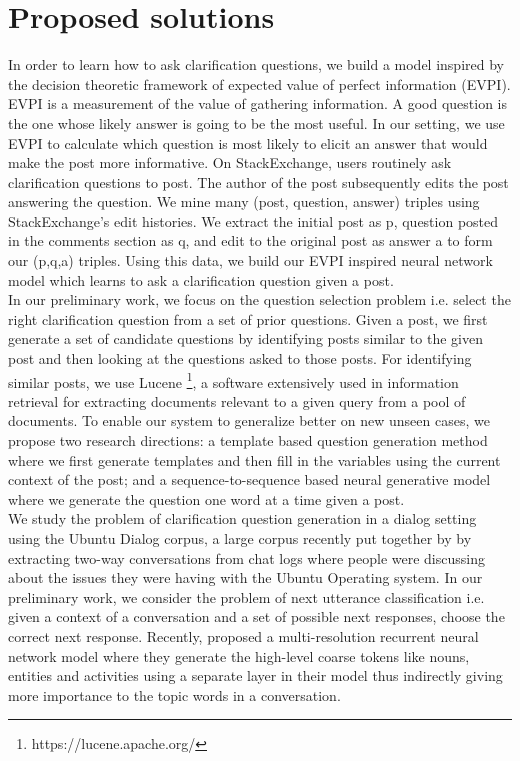 \documentclass[11pt]{report}
\renewcommand\cite{\citep}	%
\newcommand\newcite{\citet}	%
\begin{document}
\section{Proposed solutions}

In order to learn how to ask clarification questions, we build a model inspired by the decision theoretic framework of expected value of perfect information (EVPI). EVPI is a measurement of the value of gathering information. A good question is the one whose likely answer is going to be the most useful. In our setting, we use EVPI to calculate which question is most likely to elicit an answer that would make the post more informative. On StackExchange, users routinely ask clarification questions to post. The author of the post subsequently edits the post answering the question. We mine many (post, question, answer) triples using StackExchange's edit histories. We extract the initial post as p, question posted in the comments section as q, and edit to the original post as answer a to form our (p,q,a) triples. Using this data, we build our EVPI inspired neural network model which learns to ask a clarification question given a post.\\

\noindent
In our preliminary work, we focus on the question selection problem i.e. select the right clarification question from a set of prior questions. Given a post, we first generate a set of candidate questions by identifying posts similar to the given post and then looking at the questions asked to those posts. For identifying similar posts, we use Lucene \footnote{https://lucene.apache.org/}, a software extensively used in information retrieval for extracting documents relevant to a given query from a pool of documents. To enable our system to generalize better on new unseen cases, we propose two research directions: a template based question generation method where we first generate templates and then fill in the variables using the current context of the post; and a sequence-to-sequence based neural generative model where we generate the question one word at a time given a post. \\

\noindent
We study the problem of clarification question generation in a dialog setting using the Ubuntu Dialog corpus, a large corpus recently put together by \newcite{lowe2015ubuntu} by extracting two-way conversations from chat logs where people were discussing about the issues they were having with the Ubuntu Operating system. In our preliminary work, we consider the problem of next utterance classification i.e. given a context of a conversation and a set of possible next responses, choose the correct next response. Recently, \cite{serban2016multiresolution} proposed a multi-resolution recurrent neural network model where they generate the high-level coarse tokens like nouns, entities and activities using a separate layer in their model thus indirectly giving more importance to the topic words in a conversation. \\
\end{document}
